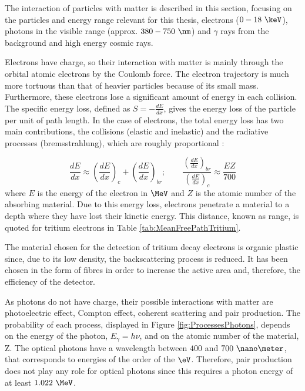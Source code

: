 The interaction of particles with matter is described in this section, focusing on the particles and energy range relevant for this thesis, electrons ($0-18~\keV$), photons in the visible range (approx. $380-750~\nm$) and $\gamma$ rays from the background and high energy cosmic rays.

Electrons have charge, so their interaction with matter is mainly through the orbital atomic  electrons by the Coulomb force. The electron trajectory is much more tortuous than that of heavier particles because of its small mass. Furthermore, these electrons lose a significant amount of energy in each collision. The specific energy loss, defined as $S=-\displaystyle{\frac{dE}{dx}}$, gives the energy loss of the particle per unit of path length. In the case of electrons, the total energy loss has two main contributions, the collisions (elastic and inelastic) and the radiative processes (bremsstrahlung), which are roughly proportional \cite{Knoll, Leo}:

\begin{equation}
\frac{dE}{dx} \approx \left(\frac{dE}{dx}\right)_{c} + \left(\frac{dE}{dx}\right)_{br} ; \qquad \frac{\displaystyle{\left(\frac{dE}{dx}\right)_{br}}}{\displaystyle{\left(\frac{dE}{dx}\right)_{c}}} \approx \frac{EZ}{700}
\label{eq:ElectronInteraction}
\end{equation}
where $E$ is the energy of the electron in $\MeV$ and $Z$ is the atomic number of the absorbing material. Due to this energy loss, electrons penetrate a material to a depth where they have lost their kinetic energy. This distance, known as range, is quoted for tritium electrons in Table \ref{tab:MeanFreePathTritium}. 

The material chosen for the detection of tritium decay electrons is organic plastic since, due to its low density, the backscattering process is reduced. It has been chosen in the form of fibres in order to increase the active area and, therefore, the efficiency of the detector.

As photons do not have charge, their possible interactions with matter are photoelectric effect, Compton effect, coherent scattering and pair production. The probability of each process, displayed in Figure \ref{fig:ProcessesPhotons}, depends on the energy of the photon, $E_\gamma = h\nu$, and on the atomic number of the material, Z. The optical photons have a wavelength between $400$ and $700~\nano\meter$, that corresponds to energies of the order of the $\eV$. Therefore, pair production does not play any role for optical photons since this requires a photon energy of at least $1.022~\MeV$.


